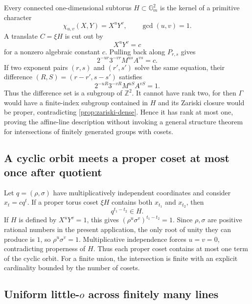 \documentclass[11pt,oneside]{article}
\theoremstyle{definition}
\newcommand{\Z}{\mathbb{Z}}
\newcommand{\Gm}{\mathbb{G}_{m}}
\begin{document}
Every connected one-dimensional subtorus $H\subset\Gm^2$ is the kernel of
a primitive character
\begin{equation}\label{eq:character-H}
  \chi_{u,v}(X,Y)=X^uY^v,
  \qquad \gcd(u,v)=1.
\end{equation}
A translate $C=\xi H$ is cut out by
\begin{equation}\label{eq:translate-equation}
  X^uY^v=c
\end{equation}
for a nonzero algebraic constant $c$.  Pulling back along
$P_{r,s}$ gives
\begin{equation}\label{eq:pullback-character}
  2^{-ur}3^{-vr}M^{us}A^{vs}=c.
\end{equation}
If two exponent pairs $(r,s)$ and $(r',s')$ solve the same equation, their
difference $(R,S)=(r-r',s-s')$ satisfies
\begin{equation}\label{eq:kernel-character}
  2^{-uR}3^{-vR}M^{uS}A^{vS}=1.
\end{equation}
Thus the difference set is a subgroup of $\Z^2$.  It cannot have rank two,
for then $\Gamma$ would have a finite-index subgroup contained in $H$ and
its Zariski closure would be proper, contradicting
\cref{prop:zariski-dense}.  Hence it has rank at most one, proving the
affine-line description without invoking a general structure theorem for
intersections of finitely generated groups with cosets.

\subsection{A cyclic orbit meets a proper coset at most once after quotient}

Let $q=(\rho,\sigma)$ have multiplicatively independent coordinates and
consider $x_t=cq^t$.  If a proper torus coset $\xi H$ contains both
$x_{t_1}$ and $x_{t_2}$, then
\begin{equation}\label{eq:qdiff-H}
  q^{t_1-t_2}\in H.
\end{equation}
If $H$ is defined by $X^uY^v=1$, this gives
$(\rho^u\sigma^v)^{t_1-t_2}=1$.  Since $\rho,\sigma$ are positive rational
numbers in the present application, the only root of unity they can
produce is $1$, so $\rho^u\sigma^v=1$.  Multiplicative independence forces
$u=v=0$, contradicting properness of $H$.  Thus each proper coset contains
at most one term of the cyclic orbit.  For a finite union, the intersection
is finite with an explicit cardinality bounded by the number of cosets.

\subsection{Uniform little-$o$ across finitely many lines}
\end{document}
